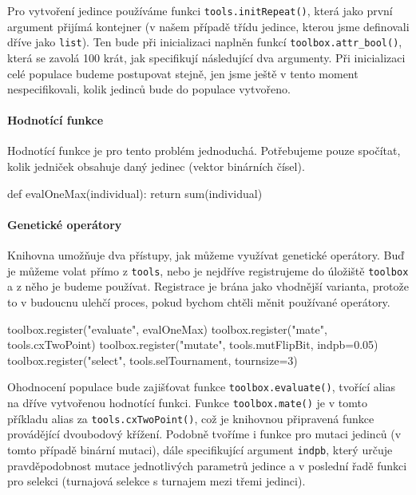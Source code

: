 Pro vytvoření jedince používáme funkci \texttt{tools.initRepeat()}, která jako
první argument přijímá kontejner (v našem případě třídu jedince, kterou jsme
definovali dříve jako \texttt{list}). Ten bude při inicializaci naplněn funkcí
\texttt{toolbox.attr\_bool()}, která se zavolá 100 krát, jak specifikují
následující dva argumenty. Při inicializaci celé populace budeme postupovat
stejně, jen jsme ještě v tento moment nespecifikovali, kolik jedinců bude do
populace vytvořeno.

\paragraph{Hodnotící funkce}
Hodnotící funkce je pro tento problém jednoduchá. Potřebujeme pouze spočítat,
kolik jedniček obsahuje daný jedinec (vektor binárních čísel).

\begin{code}
def evalOneMax(individual):
    return sum(individual)
\end{code}

\paragraph{Genetické operátory}
Knihovna umožňuje dva přístupy, jak můžeme využívat genetické operátory. Buď je
můžeme volat přímo z \texttt{tools}, nebo je nejdříve registrujeme do úložiště
\texttt{toolbox} a z něho je budeme používat. Registrace je brána jako
vhodnější varianta, protože to v budoucnu ulehčí proces, pokud bychom chtěli
měnit používané operátory.

\begin{code}
toolbox.register("evaluate", evalOneMax)
toolbox.register("mate", tools.cxTwoPoint)
toolbox.register("mutate", tools.mutFlipBit, indpb=0.05)
toolbox.register("select", tools.selTournament, tournsize=3)
\end{code}

Ohodnocení populace bude zajišťovat funkce \texttt{toolbox.evaluate()}, tvořící
alias na dříve vytvořenou hodnotící funkci. Funkce \texttt{toolbox.mate()} je
v tomto příkladu alias za \texttt{tools.cxTwoPoint()}, což je knihovnou
připravená funkce provádějící dvoubodový křížení. Podobně tvoříme i funkce pro
mutaci jedinců (v tomto případě binární mutaci), dále specifikující argument
\texttt{indpb}, který určuje pravděpodobnost mutace jednotlivých parametrů
jedince a v poslední řadě funkci pro selekci (turnajová selekce s turnajem mezi
třemi jedinci).
        
